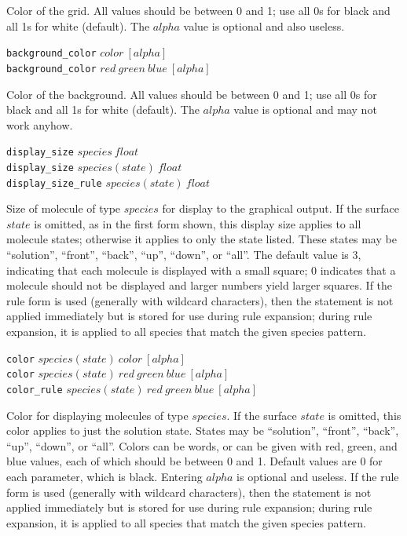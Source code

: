 \documentclass {scrbook}
\newcommand {\ttt} {\texttt}
\begin{document}
\begin{description}
Color of the grid. All values should be between 0 and 1; use all 0s for black and all 1s for white (default). The $alpha$ value is optional and also useless.

\item{\ttt{background\_color} $color\ [alpha]$\\
\ttt{background\_color} $red\ green\ blue\ [alpha]$}

Color of the background. All values should be between 0 and 1; use all 0s for black and all 1s for white (default). The $alpha$ value is optional and may not work anyhow.

\item{\ttt{display\_size} $species\ float$\\
\ttt{display\_size} $species(state)\ float$\\
\ttt{display\_size\_rule} $species(state)\ float$}

Size of molecule of type $species$ for display to the graphical output. If the surface $state$ is omitted, as in the first form shown, this display size applies to all molecule states; otherwise it applies to only the state listed. These states may be ``solution'', ``front'', ``back'', ``up'', ``down'', or ``all''. The default value is 3, indicating that each molecule is displayed with a small square; 0 indicates that a molecule should not be displayed and larger numbers yield larger squares. If the rule form is used (generally with wildcard characters), then the statement is not applied immediately but is stored for use during rule expansion; during rule expansion, it is applied to all species that match the given species pattern.

\item{\ttt{color} $species(state)\ color\ [alpha]$\\
\ttt{color} $species(state)\ red\ green\ blue\ [alpha]$\\
\ttt{color\_rule} $species(state)\ red\ green\ blue\ [alpha]$}

Color for displaying molecules of type $species$. If the surface $state$ is omitted, this color applies to just the solution state. States may be ``solution'', ``front'', ``back'', ``up'', ``down'', or ``all''. Colors can be words, or can be given with red, green, and blue values, each of which should be between 0 and 1. Default values are 0 for each parameter, which is black. Entering $alpha$ is optional and useless. If the rule form is used (generally with wildcard characters), then the statement is not applied immediately but is stored for use during rule expansion; during rule expansion, it is applied to all species that match the given species pattern.


\end{description}
\end{document}
